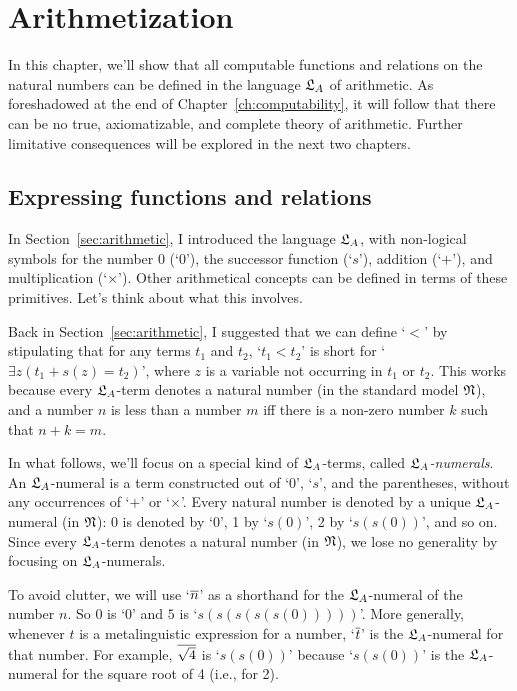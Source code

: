 \setcounter{chapter}{7}
\chapter{Arithmetization}\label{ch:representability}

In this chapter,
we'll show that
all computable functions and relations on the natural numbers
can be defined in the language $\mathfrak{L}_A$ of arithmetic.
As foreshadowed at the end of Chapter~\ref{ch:computability},
it will follow that
there can be no true, axiomatizable, and complete theory of arithmetic.
Further limitative consequences will be explored in the next two chapters.

\section{Expressing functions and relations}\label{sec:expressing}

In Section~\ref{sec:arithmetic},
I introduced the language $\mathfrak{L}_{A}$,
with non-logical symbols for the number 0 (`0'), the successor function (`$s$'), addition (`$+$'), and multiplication (`$\times$').
Other arithmetical concepts can be defined in terms of these primitives.
Let's think about what this involves.

Back in Section~\ref{sec:arithmetic},
I suggested that we can define `$<$' by stipulating that
for any terms $t_{1}$ and $t_{2}$,
`$t_{1} < t_{2}$' is short for `$\exists z (t_1 + s(z) = t_2)$',
where $z$ is a variable not occurring in $t_1$ or $t_2$.
This works because
every $\mathfrak{L}_A$-term denotes a natural number (in the standard model $\mathfrak{N}$),
and a number $n$ is less than a number $m$
iff there is a non-zero number $k$ such that $n + k = m$.

In what follows,
we'll focus on a special kind of $\mathfrak{L}_A$-terms, called \emph{$\mathfrak{L}_A$-numerals}.
An $\mathfrak{L}_A$-numeral is a term constructed out of `0', `$s$', and the parentheses,
without any occurrences of `$+$' or `$\times$'.
Every natural number is denoted by a unique $\mathfrak{L}_{A}$-numeral (in $\mathfrak{N}$):
0 is denoted by `0',
1 by `$s(0)$',
2 by `$s(s(0))$',
and so on.
Since every $\mathfrak{L}_A$-term denotes a natural number (in $\mathfrak{N}$),
we lose no generality by focusing on $\mathfrak{L}_A$-numerals.

To avoid clutter,
we will use `$\overline{n}$' as a shorthand for the $\mathfrak{L}_{A}$-numeral of the number $n$.
So $\num{0}$ is `0' and $\num{5}$ is `$s(s(s(s(s(0)))))$'.
More generally,
whenever $t$ is a metalinguistic expression for a number,
`$\overline{t}$' is the $\mathfrak{L}_{A}$-numeral for that number.
For example,
$\overline{\sqrt{4}}$ is `$s(s(0))$' because
`$s(s(0))$' is the $\mathfrak{L}_{A}$-numeral for the square root of 4 (i.e., for 2).

